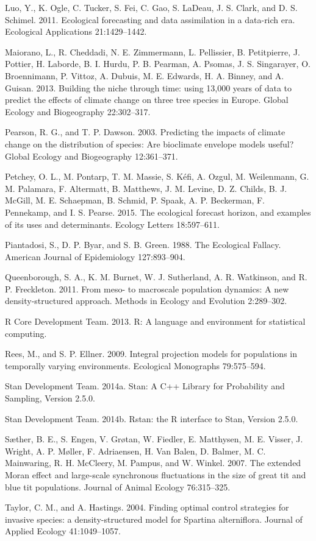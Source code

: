 \documentclass[12pt,]{article}
\begin{document}
Luo, Y., K. Ogle, C. Tucker, S. Fei, C. Gao, S. LaDeau, J. S. Clark, and
D. S. Schimel. 2011. Ecological forecasting and data assimilation in a
data-rich era. Ecological Applications 21:1429--1442.

Maiorano, L., R. Cheddadi, N. E. Zimmermann, L. Pellissier, B.
Petitpierre, J. Pottier, H. Laborde, B. I. Hurdu, P. B. Pearman, A.
Psomas, J. S. Singarayer, O. Broennimann, P. Vittoz, A. Dubuis, M. E.
Edwards, H. A. Binney, and A. Guisan. 2013. Building the niche through
time: using 13,000 years of data to predict the effects of climate
change on three tree species in Europe. Global Ecology and Biogeography
22:302--317.

Pearson, R. G., and T. P. Dawson. 2003. Predicting the impacts of
climate change on the distribution of species: Are bioclimate envelope
models useful? Global Ecology and Biogeography 12:361--371.

Petchey, O. L., M. Pontarp, T. M. Massie, S. Kéfi, A. Ozgul, M.
Weilenmann, G. M. Palamara, F. Altermatt, B. Matthews, J. M. Levine, D.
Z. Childs, B. J. McGill, M. E. Schaepman, B. Schmid, P. Spaak, A. P.
Beckerman, F. Pennekamp, and I. S. Pearse. 2015. The ecological forecast
horizon, and examples of its uses and determinants. Ecology Letters
18:597--611.

Piantadosi, S., D. P. Byar, and S. B. Green. 1988. The Ecological
Fallacy. American Journal of Epidemiology 127:893--904.

Queenborough, S. A., K. M. Burnet, W. J. Sutherland, A. R. Watkinson,
and R. P. Freckleton. 2011. From meso- to macroscale population
dynamics: A new density-structured approach. Methods in Ecology and
Evolution 2:289--302.

R Core Development Team. 2013. R: A language and environment for
statistical computing.

Rees, M., and S. P. Ellner. 2009. Integral projection models for
populations in temporally varying environments. Ecological Monographs
79:575--594.

Stan Development Team. 2014a. Stan: A C++ Library for Probability and
Sampling, Version 2.5.0.

Stan Development Team. 2014b. Rstan: the R interface to Stan, Version
2.5.0.

Sæther, B. E., S. Engen, V. Grøtan, W. Fiedler, E. Matthysen, M. E.
Visser, J. Wright, A. P. Møller, F. Adriaensen, H. {Van Balen}, D.
Balmer, M. C. Mainwaring, R. H. McCleery, M. Pampus, and W. Winkel.
2007. The extended Moran effect and large-scale synchronous fluctuations
in the size of great tit and blue tit populations. Journal of Animal
Ecology 76:315--325.

Taylor, C. M., and A. Hastings. 2004. Finding optimal control strategies
for invasive species: a density-structured model for Spartina
alterniflora. Journal of Applied Ecology 41:1049--1057.
\end{document}
